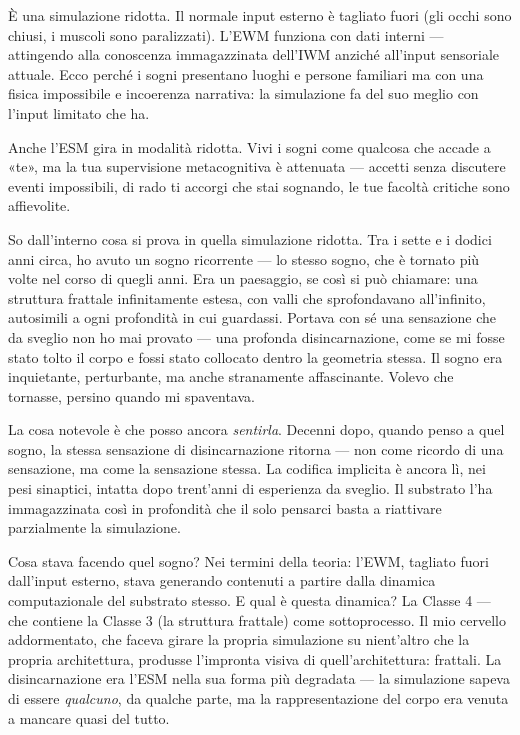 \documentclass[11pt, twoside, openright]{book}
\begin{document}
È una simulazione ridotta. Il normale input esterno è tagliato fuori (gli occhi sono chiusi, i muscoli sono paralizzati). L'EWM funziona con dati interni --- attingendo alla conoscenza immagazzinata dell'IWM anziché all'input sensoriale attuale. Ecco perché i sogni presentano luoghi e persone familiari ma con una fisica impossibile e incoerenza narrativa: la simulazione fa del suo meglio con l'input limitato che ha.

Anche l'ESM gira in modalità ridotta. Vivi i sogni come qualcosa che accade a «te», ma la tua supervisione metacognitiva è attenuata --- accetti senza discutere eventi impossibili, di rado ti accorgi che stai sognando, le tue facoltà critiche sono affievolite.

So dall'interno cosa si prova in quella simulazione ridotta. Tra i sette e i dodici anni circa, ho avuto un sogno ricorrente --- lo stesso sogno, che è tornato più volte nel corso di quegli anni. Era un paesaggio, se così si può chiamare: una struttura frattale infinitamente estesa, con valli che sprofondavano all'infinito, autosimili a ogni profondità in cui guardassi. Portava con sé una sensazione che da sveglio non ho mai provato --- una profonda disincarnazione, come se mi fosse stato tolto il corpo e fossi stato collocato dentro la geometria stessa. Il sogno era inquietante, perturbante, ma anche stranamente affascinante. Volevo che tornasse, persino quando mi spaventava.

La cosa notevole è che posso ancora \textit{sentirla}. Decenni dopo, quando penso a quel sogno, la stessa sensazione di disincarnazione ritorna --- non come ricordo di una sensazione, ma come la sensazione stessa. La codifica implicita è ancora lì, nei pesi sinaptici, intatta dopo trent'anni di esperienza da sveglio. Il substrato l'ha immagazzinata così in profondità che il solo pensarci basta a riattivare parzialmente la simulazione.

Cosa stava facendo quel sogno? Nei termini della teoria: l'EWM, tagliato fuori dall'input esterno, stava generando contenuti a partire dalla dinamica computazionale del substrato stesso. E qual è questa dinamica? La Classe 4 --- che contiene la Classe 3 (la struttura frattale) come sottoprocesso. Il mio cervello addormentato, che faceva girare la propria simulazione su nient'altro che la propria architettura, produsse l'impronta visiva di quell'architettura: frattali. La disincarnazione era l'ESM nella sua forma più degradata --- la simulazione sapeva di essere \textit{qualcuno}, da qualche parte, ma la rappresentazione del corpo era venuta a mancare quasi del tutto.
\end{document}
